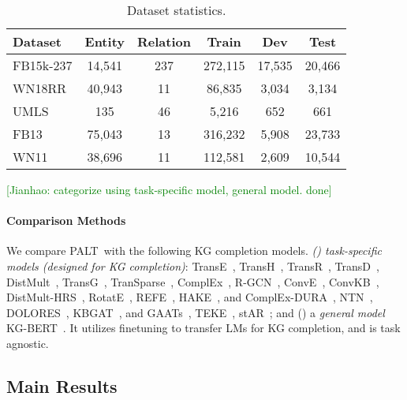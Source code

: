 \documentclass[11pt]{article}
\newcommand{\method}{\textsc{PALT}}
\newcommand{\jianhao}[1]{\textcolor{green}{[Jianhao: #1]}}
\newcommand{\jianhao}[1]{}
\begin{document}
\begin{table}[htbp]
\centering
\resizebox{0.9\linewidth}{!}
  {
    \begin{tabular}{l|c|c|c|c|c}
        \toprule
        {\bf Dataset} &  {\bf Entity} &  {\bf Relation} &  {\bf Train} &  {\bf Dev} &  {\bf Test}\\
        \hline
        FB15k-237 &  14,541 & 237 & 272,115 & 17,535 & 20,466 \\
        \hline
WN18RR & 40,943 & 11 & 86,835 & 3,034 & 3,134 \\
        \hline
UMLS & 135 & 46 & 5,216 & 652 & 661 \\
        \hline
        FB13 & 75,043 & 13 & 316,232 & 5,908 & 23,733 \\
        \hline
        WN11 & 38,696 & 11 & 112,581 & 2,609 &  10,544 \\
        \bottomrule
    \end{tabular}}
    \caption{Dataset statistics.}
    \label{tab:statistics}
\end{table} 
\jianhao{categorize using task-specific model, general model. done}
\paragraph{Comparison Methods}
We compare \method\ with the following KG completion models.
    {\sl (\expandafter{}) task-specific models (designed for KG completion)}: TransE~\cite{TransE}, 
    TransH~\cite{TransH},
    TransR~\cite{TransR}, 
    TransD~\cite{ji_knowledge_2015},
    DistMult~\cite{DistMult}, 
    TransG~\cite{xiao_transg_2016}, TranSparse~\cite{ji_knowledge_2016},  ComplEx~\cite{trouillon_complex_2016}, R-GCN~\cite{schlichtkrull_modeling_2018},
    ConvE~\cite{ConvE}, 
    ConvKB~\cite{ConvKB}, 
    DistMult-HRS~\cite{zhang_knowledge_2018},
    RotatE~\cite{RotateE},     
    REFE~\cite{chami-etal-2020-low},
    HAKE~\cite{zhang_learning_2019},
    and ComplEx-DURA~\cite{NEURIPS2020_f6185f0e},
    NTN~\cite{KB_NL_1},
    DOLORES~\cite{wang_dolores:_2018}, 
    KBGAT~\cite{nathani-etal-2019-learning},
    and GAATs~\cite{wang_knowledge_2020},
    TEKE~\cite{wang_text-enhanced_2016},
    stAR~\cite{wang_structure-augmented_2021};
    and (\expandafter{}) a {\sl general model} KG-BERT~\cite{KGBERT}. It utilizes finetuning to transfer LMs for KG completion, and is task agnostic.

\subsection{Main Results}
\end{document}
